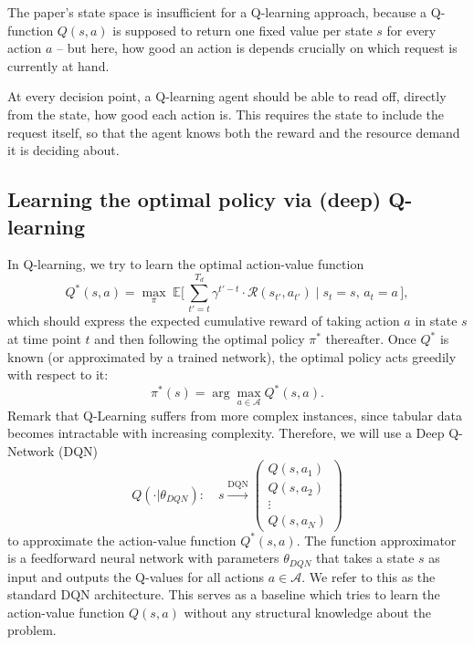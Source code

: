 The paper's state space is insufficient for a Q-learning approach, because a Q-function $Q(s,a)$ is
supposed to return one fixed value per state $s$ for every action $a$ -- but here, how good an
action is depends crucially on which request is currently at hand.

At every decision point, a Q-learning agent should be able to read off, directly from the state,
how good each action is. This requires the state to include the request itself, so that the agent
knows both the reward and the resource demand it is deciding about.

\subsection{Learning the optimal policy via (deep) Q-learning}
In Q-learning, we try to learn the optimal action-value function
\[
  Q^*(s,a) = \max_\pi \; \mathbb{E}\Big[\, \sum_{t'=t}^{T_d} \gamma^{t'-t} \cdot \mathcal{R}(s_{t'}, a_{t'}) \;\Big|\; s_t = s,\, a_t = a \,\Big],
\]
which should express the expected cumulative reward of taking action $a$ in state $s$ at time point $t$ and then following the optimal policy $\pi^*$ thereafter.
Once $Q^*$ is known (or
approximated by a trained network), the optimal policy acts greedily with
respect to it:
\[
  \pi^*(s) = \arg\max_{a \in \mathcal{A}} Q^*(s,a).
\]
Remark that Q-Learning suffers from more complex instances, since tabular data becomes intractable with increasing complexity. Therefore, we will use a Deep Q-Network (DQN) 
$$
Q(\cdot \vert \theta_{DQN}): \quad s \xrightarrow{\text{DQN}}   \begin{pmatrix} Q(s, a_1) \\ Q(s, a_2) \\ \vdots \\ Q(s, a_N) \end{pmatrix}
$$
to approximate the action-value function $Q^*(s,a)$.
The function approximator is a feedforward neural network with parameters $\theta_{DQN}$ that takes a state $s$ as input and outputs the Q-values for all actions $a \in \mathcal{A}$. We refer to this as the standard DQN architecture.
This serves as a baseline which tries to learn the action-value function $Q(s,a)$ without any structural knowledge about the problem.

